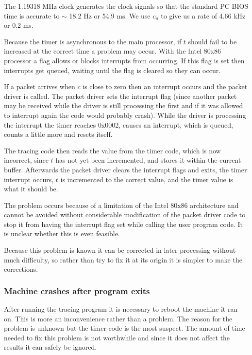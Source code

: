 The 1.19318 MHz clock generates the clock signals so that the standard
PC BIOS time is accurate to $\sim$ 18.2 Hz or 54.9 ms.  We use $c_u$
to give us a rate of 4.66 kHz or 0.2 ms.

Because the timer is asynchronous to the main processor, if $t$ should
fail to be increased at the correct time a problem may occur.  With
the Intel 80x86 processor a flag allows or blocks interrupts from
occurring.  If this flag is set then interrupts get queued, waiting
until the flag is cleared so they can occur.

If a packet arrives when $c$ is close to zero then an interrupt occurs
and the packet driver is called.  The packet driver sets the interrupt
flag (since another packet may be received while the driver is still
processing the first and if it was allowed to interrupt again the code
would probably crash).  While the driver is processing the interrupt
the timer reaches 0x0002, causes an interrupt, which is queued,
counts a little more and resets itself.

The tracing code then reads the value from the timer code, which is
now incorrect, since $t$ has not yet been incremented, and stores it
within the current buffer.  Afterwards the packet driver clears the
interrupt flags and exits, the timer interrupt occurs, $t$ is
incremented to the correct value, and the timer value is what it
should be.

The problem occurs because of a limitation of the Intel 80x86
architecture and cannot be avoided without considerable modification
of the packet driver code to stop it from having the interrupt flag
set while calling the user program code.  It is unclear whether this
is even feasible.

Because this problem is known it can be corrected in later processing
without much difficulty, so rather than try to fix it at
its origin it is simpler to make the corrections.

\subsubsection{Machine crashes after program exits}

After running the tracing program it is necessary to reboot the
machine it ran on.  This is more an inconvenience rather than a
problem.  The reason for the problem is unknown but the timer code is
the most suspect.  The amount of time needed to fix this problem is
not worthwhile and since it does not affect the results it can safely be
ignored.

